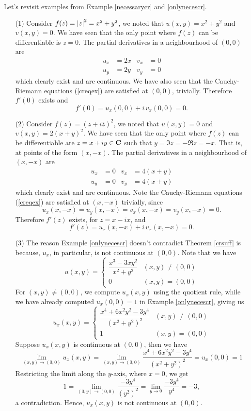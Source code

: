 \begin{example}
Let's revisit examples from Example \ref{necessarycr} and \ref{onlynecescr}.
\begin{itemize}
\item[(1)] Consider $f(z) = \left\lvert z\right\rvert^2 = x^2 + y^2$, we noted that $u(x,y) = x^2 + y^2$ and $v(x,y) = 0$. We have seen that the only point where $f(z)$ can be differentiable is $z = 0$. The partial derivatives in a neighbourhood of $(0,0)$ are
\begin{align*}
u_x &= 2x & v_x &= 0\\[0.5em]
u_y &= 2y & v_y &= 0
\end{align*}
which clearly exist and are continuous. We have also seen that the Cauchy-Riemann equations (\ref{creqex}) are satisfied at $(0,0)$, trivially. Therefore $f'(0)$ exists and \[f'(0) = u_x(0,0) + i\,v_x(0,0) = 0.\]

\item[(2)] Consider $f(z) = (z + i\overline{z})^2$, we noted that $u(x,y) = 0$ and $v(x,y) = 2(x + y)^2$. We have seen that the only point where $f(z)$ can be differentiable are $z = x + iy \in \mathbf C$ such that $y = \Im z = -\Re z = -x$. That is, at points of the form $(x,-x)$. The partial derivatives in a neighbourhood of $(x,-x)$ are
\begin{align*}
u_x &= 0 & v_x &= 4(x + y)\\[0.5em]
u_y &= 0 & v_y &= 4(x + y)
\end{align*}
which clearly exist and are continuous. Note the Cauchy-Riemann equations (\ref{creqex}) are satisfied at $(x,-x)$ trivially, since \[u_x(x,-x) = u_y(x,-x) = v_x(x,-x) = v_y(x,-x) = 0.\]
Therefore $f'(z)$ exists, for $z = x - ix$, and \[f'(z) = u_x(x,-x) + i\,v_x(x,-x) = 0.\]

\item[(3)] The reason Example \ref{onlynecescr} doesn't contradict Theorem \ref{crsuff} is because, $u_x$, in particular, is not continuous at $(0,0)$. Note that we have
\[u(x,y) = \begin{cases}\dfrac{x^3 - 3xy^2}{x^2 + y^2} & (x,y) \neq (0,0)\\[1em] 0 & (x,y) = (0,0) \end{cases}\]
For $(x,y) \neq (0,0)$, we compute $u_x(x,y)$ using the quotient rule, while we have already computed $u_x(0,0) = 1$ in Example \ref{onlynecescr}, giving us
\[u_x(x,y) = \begin{cases}\dfrac{x^4 + 6x^2y^2 - 3y^4}{(x^2 + y^2)^2} & (x,y) \neq (0,0)\\[1em] 1 & (x,y) = (0,0) \end{cases}\]
Suppose $u_x(x,y)$ is continuous at $(0,0)$, then we have
\[\lim_{(x,y) \to (0,0)}u_x(x,y) = \lim_{(x,y) \to (0,0)}\dfrac{x^4 + 6x^2y^2 - 3y^4}{(x^2 + y^2)^2} = u_x(0,0) = 1\]
Restricting the limit along the $y$-axis, where $x = 0$, we get
\[1 = \lim_{(0,y) \to (0,0)}\dfrac{-3y^4}{(y^2)^2} = \lim_{y \to 0}\dfrac{-3y^4}{y^4} = -3,\]
a contradiction. Hence, $u_x(x,y)$ is not continuous at $(0,0)$.
\end{itemize}
\end{example}


